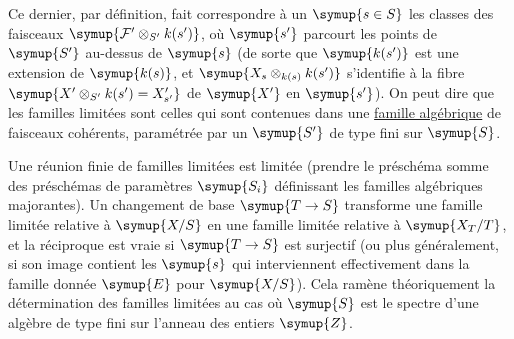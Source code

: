 Ce dernier, par définition, fait correspondre à un $\symup{s\in S}$ les classes des
faisceaux $\symup{\mathcal F'\otimes_{S'}k(s')}$, où $\symup{s'}$ parcourt les points de $\symup{S'}$
au-dessus de $\symup{s}$ (de sorte que $\symup{k(s')}$ est une extension de $\symup{k(s)}$, et
$\symup{X_s\otimes_{k(s)}k(s')}$ s'identifie à la fibre
$\symup{X'\otimes_{S'}k(s')=X'_{s'}}$ de $\symup{X'}$ en $\symup{s'}$). On peut dire que les familles
limitées sont celles qui sont contenues dans une \uline{famille algébrique} de
faisceaux cohérents, paramétrée par un $\symup{S'}$ de type fini sur $\symup{S}$.

Une réunion finie de familles limitées est limitée (prendre le préschéma somme
des préschémas de paramètres $\symup{S_i}$ définissant les familles algébriques
majorantes). Un changement de base $\symup{T\to S}$ transforme une famille
limitée relative à $\symup{X/S}$ en une famille limitée relative à $\symup{X_T/T}$, et la
réciproque est vraie si $\symup{T\to S}$ est surjectif (ou plus
généralement, si son image contient les $\symup{s}$ qui interviennent effectivement
dans la famille donnée $\symup{E}$ pour $\symup{X/S}$). Cela ramène théoriquement la
détermination des familles limitées au cas où $\symup{S}$ est le spectre d'une algèbre
de type fini sur l'anneau des entiers $\symup{Z}$.

